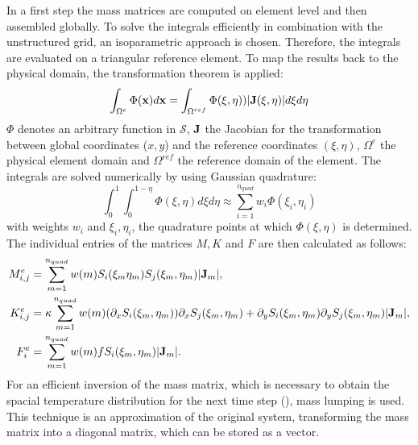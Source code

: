 In a first step the mass matrices are computed on element level and then assembled globally. To solve the integrals efficiently in combination with the unstructured grid, an isoparametric approach is chosen. Therefore, the integrals are evaluated on a triangular reference element. To map the results back to the physical domain, the transformation theorem is applied:
\begin{equation}
	\int_{\Omega^e} \Phi(\boldsymbol{\mathbf{x}}) d\boldsymbol{\mathbf{x}} = \int_{\Omega^{ref}} \Phi(\xi, \eta)) |\boldsymbol{\mathbf{J}}(\xi, \eta)| d\xi d\eta 
\end{equation}
$\Phi$ denotes an arbitrary function in $\mathcal{S}$, $\boldsymbol{\mathbf{J}}$ the Jacobian for the transformation between global coordinates ($x,y$) and the reference coordinates $(\xi, \eta)$, $\Omega^e$ the physical element domain and $\Omega^{ref}$ the reference domain of the element. The integrals are solved numerically by using Gaussian quadrature:
\begin{equation}
	\int_0^1 \int_{0}^{1-\eta} \Phi(\xi, \eta) d\xi d\eta \approx \sum_{i=1}^{n_{quad}} w_i \Phi(\xi_i, \eta_i)
\end{equation}
with weights $w_i$ and $\xi_i, \eta_i$, the quadrature points at which $\Phi(\xi, \eta)$ is determined. The individual entries of the matrices $M,K$ and $F$ are then calculated as follows:
\begin{align}
	M_{i,j}^e &= \sum_{m=1}^{n_{quad}}w(m) S_i(\xi_m \eta_m)S_j(\xi_m, \eta_m) | \boldsymbol{\mathbf{J}}_m | , \label{eq:M} \\ 
	K_{i,j}^e &= \kappa \sum_{m=1}^{n_{quad}}w(m) (\partial_x S_i(\xi_m, \eta_m)) \partial_x S_j(\xi_m, \eta_m) + 
	\partial_y S_i(\xi_m, \eta_m) \partial_y S_j(\xi_m, \eta_m) | \boldsymbol{\mathbf{J}}_m | , \label{eq:K} \\
	F_i^e &=  \sum_{m=1}^{n_{quad}} w(m) f S_i(\xi_m, \eta_m) | \boldsymbol{\mathbf{J}}_m |. \label{eq:F}
 \end{align}
For an efficient inversion of the mass matrix, which is necessary to obtain the spacial temperature distribution for the next time step (), mass lumping is used. This technique is an approximation of the original system, transforming the mass matrix into a diagonal matrix, which can be stored as a vector.
\newpage

